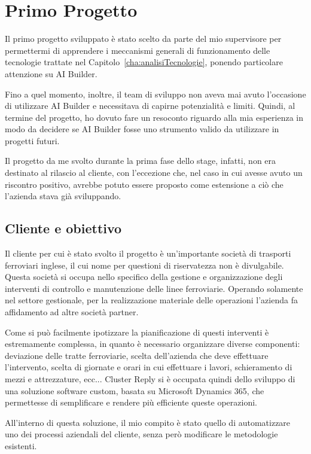 \graphicspath{{./chapters/03/assets/}}

\chapter{Primo Progetto}
\label{cha:progetto1}
Il primo progetto sviluppato è stato scelto da parte del mio supervisore per permettermi di apprendere i meccanismi generali di funzionamento delle tecnologie trattate nel Capitolo~\ref{cha:analisiTecnologie}, ponendo particolare attenzione su AI Builder. 

Fino a quel momento, inoltre, il team di sviluppo non aveva mai avuto l'occasione di utilizzare AI Builder e necessitava di capirne potenzialità e limiti. Quindi, al termine del progetto, ho dovuto fare un resoconto riguardo alla mia esperienza in modo da decidere se AI Builder fosse uno strumento valido da utilizzare in progetti futuri. 

Il progetto da me svolto durante la prima fase dello stage, infatti, non era destinato al rilascio al cliente, con l'eccezione che, nel caso in cui avesse avuto un riscontro positivo, avrebbe potuto essere proposto come estensione a ciò che l'azienda stava già sviluppando.

\section{Cliente e obiettivo}
Il cliente per cui è stato svolto il progetto è un'importante società di trasporti ferroviari inglese, il cui nome per questioni di riservatezza non è divulgabile. Questa società si occupa nello specifico della gestione e organizzazione degli interventi di controllo e manutenzione delle linee ferroviarie. Operando solamente nel settore gestionale, per la realizzazione materiale delle operazioni l'azienda fa affidamento ad altre società partner.

Come si può facilmente ipotizzare la pianificazione di questi interventi è estremamente complessa, in quanto è necessario organizzare diverse componenti: deviazione delle tratte ferroviarie, scelta dell'azienda che deve effettuare l'intervento, scelta di giornate e orari in cui effettuare i lavori, schieramento di mezzi e attrezzature, ecc...
Cluster Reply si è occupata quindi dello sviluppo di una soluzione software custom, basata su Microsoft Dynamics 365, che permettesse di semplificare e rendere più efficiente queste operazioni.

All'interno di questa soluzione, il mio compito è stato quello di automatizzare uno dei processi aziendali del cliente, senza però modificare le metodologie esistenti. 

